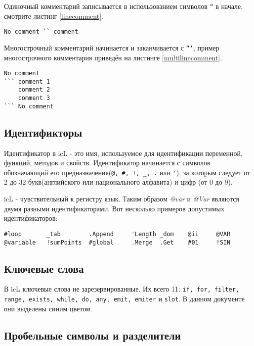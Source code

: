 \documentclass[a4paper, 14pt]{extarticle}
\begin{document}
	Одиночный комментарий записывается в использованием символов \texttt{``} в начале, смотрите листинг \ref{linecomment}.
	
	\begin{lstlisting}[caption=Одиночный комментарий,label=linecomment]
No comment `` comment
	\end{lstlisting}
	
	Многострочный комментарий начинается и заканчивается с \texttt{```}, пример многострочного комментария приведён на листинге \ref{multilinecomment}.
	
	\begin{lstlisting}[caption=Многострочный комментарий,label=multilinecomment]
No comment
``` comment 1
	comment 2
	comment 3
``` No comment
	\end{lstlisting}
	
	\subsection{Идентификторы}
	
	Идентификатор в icL - это имя, используемое для идентификации переменной, функций, методов и свойств. Идентификатор начинается с символов обозначающий его предназначение(\lstinline`@, #, !, _, .` или \lstinline`'`), за которым следует от 2 до 32 букв(английского или национального алфавита) и цифр (от 0 до 9).
	
	icL - чувствительный к регистру язык. Таким образом \textit{@var} и \textit{@Var} являются двумя разными идентификаторами. Вот несколько примеров допустимых идентификаторов:
	
	\begin{lstlisting}[numbers=none]
#loop		_tab		.Append		'Length	_dom	@ii 	@VAR
@variable	!sumPoints	#global		.Merge	.Get	#01		!SIN
	\end{lstlisting}
	
	\subsection{Ключевые слова}
	
	В icL ключевые слова не зарезервированные. Их всего 11: \lstinline`if, for, filter, range, exists, while, do, any, emit, emiter` и \lstinline`slot`. В данном документе они выделены синим цветом.
  
	\subsection{Пробельные символы и разделители}
	
\end{document}

